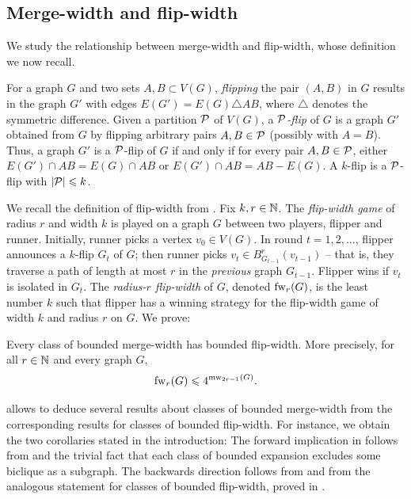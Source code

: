  






\subsection{Merge-width and flip-width}\label{sec:fw}
We study the relationship between merge-width and flip-width, whose definition we now recall.

For a graph $G$ and 
two sets $A,B\subset V(G)$,
\emph{flipping} the pair $(A,B)$ in $G$ 
results in the graph $G'$ 
with edges $E(G')=E(G)\triangle AB$, where \(\triangle\) denotes the symmetric difference.
Given a partition $\cal P$ of $V(G)$, 
a \emph{$\cal P$-flip} of $G$ is a graph $G'$
obtained from $G$ by flipping arbitrary pairs $A,B\in\cal P$ (possibly with $A=B$).
Thus, a graph $G'$ is a $\cal P$-flip of $G$ if and only if for every pair $A,B\in\cal P$, 
either $E(G')\cap AB=E(G)\cap AB$ or $E(G')\cap AB=AB-E(G)$.
A \(k\)-flip is a \(\cal P\)-flip with \(|\cal P| \le k\).

We recall the definition of flip-width from \cite{flip-width}.
Fix $k,r\in\N$.
The \emph{flip-width game} of radius $r$ and width $k$ is played on a graph $G$ between two players, flipper and runner.
Initially, runner picks a vertex $v_0\in V(G)$.
In round $t=1,2,\ldots$,
    flipper announces a $k$-flip $G_t$ of $G$;
    then runner picks $v_t\in B^r_{G_{t-1}}(v_{t-1})$ -- that is, they traverse 
    a path of length at most $r$ in the \emph{previous} graph $G_{t-1}$.
    Flipper wins if $v_t$ is isolated in $G_t$.
The \emph{radius-$r$ flip-width} of $G$, denoted $\fw_r(G)$,
is the least number $k$ such that flipper has a winning strategy for the flip-width game of width $k$ and radius $r$ on $G$.
We prove:
\begin{theorem}\label{thm:fw-cases}
  Every class of bounded merge-width has bounded flip-width.
  More precisely, for all $r\in\N$ and every graph $G$,
  $$\fw_r(G)\le 4^{\mw_{2r-1}(G)}.$$
\end{theorem}

 allows to deduce several results about classes of bounded merge-width
from the corresponding results for classes of bounded flip-width.
For instance, we obtain the two corollaries stated in the introduction:
\corbe*
The forward implication in  follows from  and the trivial fact that each class of bounded expansion excludes some biclique as a subgraph. The backwards direction follows from  and from the analogous statement for classes of bounded flip-width, proved in \cite[Thm. VI.3]{flip-width}.


